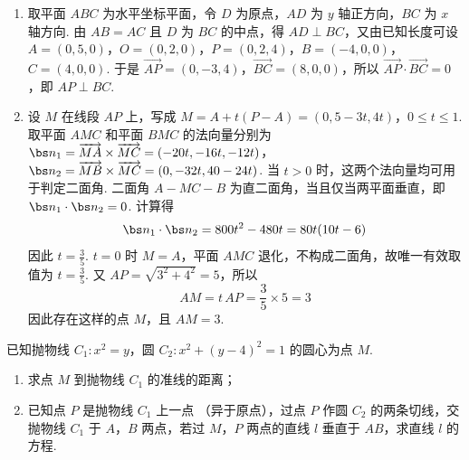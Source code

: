 \begin{solution}
\begin{enumerate}
\item
取平面 \(ABC\) 为水平坐标平面，令 \(D\) 为原点，\(AD\) 为 \(y\) 轴正方向，\(BC\) 为 \(x\) 轴方向. 由 \(AB=AC\) 且 \(D\) 为 \(BC\) 的中点，得 \(AD\perp BC\)，又由已知长度可设
\(A=(0,5,0)\)，\(O=(0,2,0)\)，\(P=(0,2,4)\)，\(B=(-4,0,0)\)，\(C=(4,0,0)\).
于是 \(\overrightarrow{AP}=(0,-3,4)\)，\(\overrightarrow{BC}=(8,0,0)\)，所以 \(\overrightarrow{AP}\cdot\overrightarrow{BC}=0\)，即 \(AP\perp BC\).

\item
设 \(M\) 在线段 \(AP\) 上，写成
\(M=A+t(P-A)=(0,5-3t,4t)\)，\(0\leqslant t\leqslant 1\).
取平面 \(AMC\) 和平面 \(BMC\) 的法向量分别为
\(\bs n_1=\overrightarrow{MA}\times\overrightarrow{MC}=(-20t,-16t,-12t)\)，\(\bs n_2=\overrightarrow{MB}\times\overrightarrow{MC}=(0,-32t,40-24t)\).
当 \(t>0\) 时，这两个法向量均可用于判定二面角. 二面角 \(A-MC-B\) 为直二面角，当且仅当两平面垂直，即 \(\bs n_1\cdot\bs n_2=0\). 计算得
\[
\bs n_1\cdot\bs n_2=800t^2-480t=80t(10t-6)
\]
因此 \(t=\frac{3}{5}\). \(t=0\) 时 \(M=A\)，平面 \(AMC\) 退化，不构成二面角，故唯一有效取值为 \(t=\frac{3}{5}\). 又 \(AP=\sqrt{3^2+4^2}=5\)，所以
\[
AM=t\,AP=\frac{3}{5}\times5=3
\]
因此存在这样的点 \(M\)，且 \(AM=3\).
\end{enumerate}
\end{solution}

\begin{problem}
已知抛物线 \(C_1: x^2 = y\)，圆 \(C_2: x^2 + (y - 4)^2 = 1\) 的圆心为点 \(M\).
\begin{enumerate}
\item 求点 \(M\) 到抛物线 \(C_{1}\) 的准线的距离；
\item 已知点 \(P\) 是抛物线 \(C_{1}\) 上一点 （异于原点），过点 \(P\) 作圆 \(C_{2}\) 的两条切线，交抛物线 \(C_{1}\) 于 \(A\)，\(B\) 两点，若过 \(M\)，\(P\) 两点的直线 \(l\) 垂直于 \(AB\)，求直线 \(l\) 的方程.
\end{enumerate}

\end{problem}

